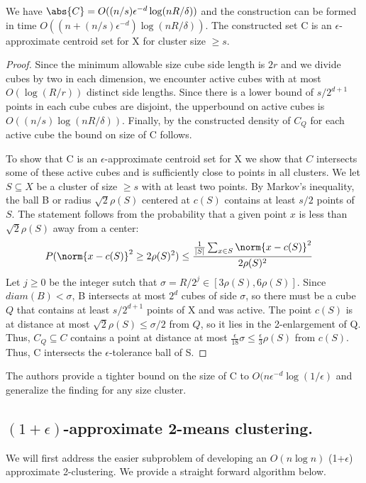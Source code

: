 \begin{lemma}We have $\abs{C} = O((n/s)\epsilon^{-d} \log(nR/\delta))$ and the construction can be formed in time $O((n+(n/s)\epsilon^{-d}) \log(nR/\delta))$. The constructed set C is an $\epsilon$-approximate centroid set for X for cluster size $\geq s$.
\end{lemma}
\begin{proof}
Since the minimum allowable size cube side length is $2r$ and we divide cubes by two in each dimension, we encounter active cubes with at most $O(\log(R/r))$ distinct side lengths. Since there is a lower bound of $s/2^{d+1}$ points in each cube cubes are disjoint, the upperbound on active cubes is $O((n/s)\log(nR/\delta))$. Finally, by the constructed density of $C_Q$ for each active cube the bound on size of C follows. 

\noindent To show that C is an $\epsilon$-approximate centroid set for X we show that $C$ intersects some of these active cubes and is sufficiently close to points in all clusters. We let $S \subseteq X$ be a cluster of size $\geq s$ with at least two points. By Markov's inequality, the ball B or radius $\sqrt{2}\rho(S)$ centered at $c(S)$ contains at least $s/2$ points of $S$. The statement follows from the probability that a given point $x$ is less than $\sqrt{2}\rho(S)$ away from a center:
\begin{align*}
    P(\norm{x-c(S)}^2 \geq 2\rho(S)^2) & \leq \frac{\frac{1}{|S|}\sum_{x\in S} \norm{x-c(S)}^2 }{2\rho(S)^2} 
\end{align*}
Let $j \geq 0$ be the integer sutch that $\sigma = R/2^j \in [3\rho(S),6\rho(S)]$. Since $diam(B) < \sigma$, B intersects at most $2^d$ cubes of side $\sigma$, so there must be a cube $Q$ that contains at least $s/2^{d+1}$ points of X and was active. The point $c(S)$ is at distance at most $\sqrt{2}\rho(S) \leq \sigma/2$ from $Q$, so it lies in the 2-enlargement of Q. Thus, $C_Q \subseteq C$ contains a point at distance at most $\frac{\epsilon}{18} \sigma \leq \frac{\epsilon}{3}\rho(S)$ from $c(S)$. Thus, C intersects the $\epsilon$-tolerance ball of S. 
\end{proof}

\begin{remark}
The authors provide a tighter bound on the size of C to $O(n\epsilon^{-d}\log(1/\epsilon)$ and generalize the finding for any size cluster.
\end{remark}
\newpage
\subsection{$(1+\epsilon)$-approximate 2-means clustering.}
We will first address the easier subproblem of developing an $O(n \log n)$ (1+$\epsilon$) approximate 2-clustering. We provide a straight forward algorithm below.

